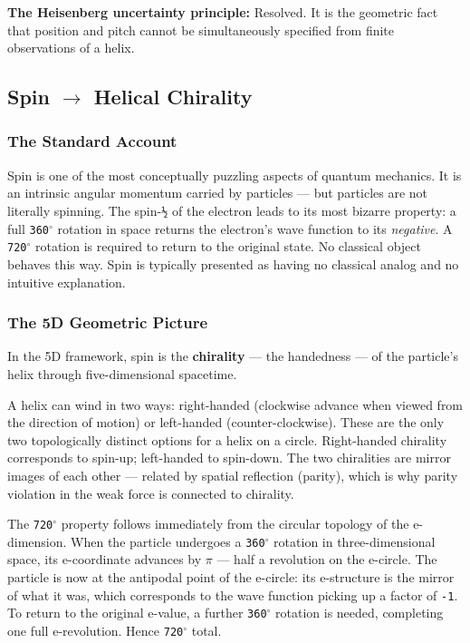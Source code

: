 \documentclass[aps,prd,preprint,superscriptaddress,longbibliography,floatfix]{revtex4-2}
\theoremstyle{remark}
\begin{document}
\textbf{The Heisenberg uncertainty principle:} Resolved. It is the geometric fact that position and pitch cannot be simultaneously specified from finite observations of a helix.



\subsection{Spin $\to$ Helical Chirality}


\subsubsection{The Standard Account}

Spin is one of the most conceptually puzzling aspects of quantum mechanics. It is an intrinsic angular momentum carried by particles --- but particles are not literally spinning. The spin-\texttt{½} of the electron leads to its most bizarre property: a full \texttt{360$^{\circ}$} rotation in space returns the electron's wave function to its \textit{negative}. A \texttt{720$^{\circ}$} rotation is required to return to the original state. No classical object behaves this way. Spin is typically presented as having no classical analog and no intuitive explanation.


\subsubsection{The 5D Geometric Picture}

In the 5D framework, spin is the \textbf{chirality} --- the handedness --- of the particle's helix through five-dimensional spacetime.

A helix can wind in two ways: right-handed (clockwise advance when viewed from the direction of motion) or left-handed (counter-clockwise). These are the only two topologically distinct options for a helix on a circle. Right-handed chirality corresponds to spin-up; left-handed to spin-down. The two chiralities are mirror images of each other --- related by spatial reflection (parity), which is why parity violation in the weak force is connected to chirality.

The \texttt{720$^{\circ}$} property follows immediately from the circular topology of the e-dimension. When the particle undergoes a \texttt{360$^{\circ}$} rotation in three-dimensional space, its e-coordinate advances by $\pi$ --- half a revolution on the e-circle. The particle is now at the antipodal point of the e-circle: its e-structure is the mirror of what it was, which corresponds to the wave function picking up a factor of \texttt{-1}. To return to the original e-value, a further \texttt{360$^{\circ}$} rotation is needed, completing one full e-revolution. Hence \texttt{720$^{\circ}$} total.
\end{document}

